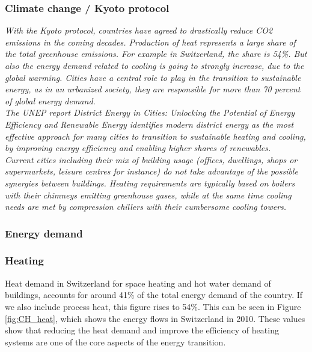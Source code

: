 \documentclass{article}
\begin{document}
\subsubsection{Climate change / Kyoto protocol}
\textit{With the Kyoto protocol, countries have agreed to drastically reduce CO2 emissions in the coming decades.
Production of heat represents a large share of the total greenhouse emissions. For example in Switzerland, the share is 54\%.
But also the energy demand related to cooling is going to strongly increase, due to the global warming.
Cities have a central role to play in the transition to sustainable energy, as in an urbanized society, they are responsible for more than 70 percent of global energy demand.\\
The UNEP report District Energy in Cities: Unlocking the Potential of Energy Efficiency and Renewable Energy identifies modern district energy as the most effective approach for many cities to transition to sustainable heating and cooling, by improving energy efficiency and enabling higher shares of renewables.\\
Current cities including their mix of building usage (offices,
dwellings, shops or supermarkets, leisure centres for instance) do
not take advantage of the possible synergies between buildings.
Heating requirements are typically based on boilers with their
chimneys emitting greenhouse gases, while at the same time
cooling needs are met by compression chillers with their cumbersome
cooling towers.}

\subsubsection{Energy demand}

\subsubsection{Heating}
Heat demand in Switzerland for space heating and hot water demand of buildings, accounts for around 41\% of the total energy demand of the country\cite{bacherEnergieRespektSchlusselFur2014}. If we also include process heat, this figure rises to 54\%. This can be seen in Figure \ref{fig:CH_heat}, which shows the energy flows in Switzerland in 2010. These values show that reducing the heat demand and improve the efficiency of heating systems are one of the core aspects of the energy transition.
\end{document}
